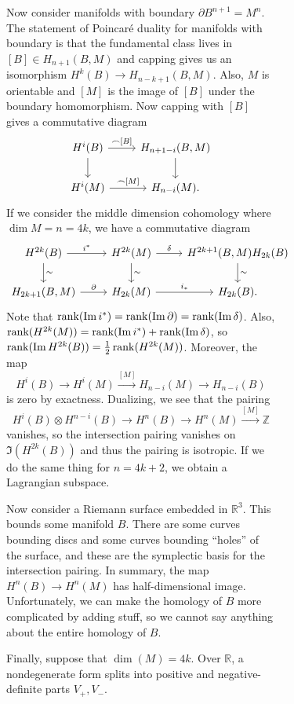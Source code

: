 \documentclass[leqno, openany]{memoir}
\theoremstyle{definition}
\theoremstyle{remark}
\theoremstyle{plain}
\theoremstyle{definition}
\theoremstyle{remark}
\newcommand{\R}{\mathbb{R}}
\newcommand{\Z}{\mathbb{Z}}
\begin{document}
\begin{figure}[H]
\begin{figure}[H]
Now consider manifolds with boundary $\partial B^{n+1} = M^n$. The statement of
Poincar\'e duality for manifolds with boundary is that the fundamental class
lives in $[B] \in H_{n+1}(B, M)$ and capping gives us an isomorphism $H^k(B)
\to H_{n-k+1}(B, M)$. Also, $M$ is orientable and $[M]$ is the image of $[B]$
under the boundary homomorphism. Now capping with $[B]$ gives a commutative
diagram \begin{equation*} \begin{tikzcd} H^i(B) \arrow{r}{\frown {[B]}}
\arrow{d} & H_{n+1-i}(B,M) \arrow{d} \\ H^i(M) \arrow{r}{\frown {[M]}} &
H_{n-i}(M).  \end{tikzcd} \end{equation*} If we consider the middle dimension
cohomology where $\dim M = n = 4k$, we have a commutative diagram
\begin{equation*} \begin{tikzcd} H^{2k}(B) \arrow{r}{i^*} \arrow{d}{\sim} &
    H^{2k}(M) \arrow{d}{\sim} \arrow{r}{\delta} & H^{2k+1}(B,M) \arrow{d}{\sim}
    H_{2k}(B) \\ H_{2k+1}(B,M) \arrow{r}{\partial} & H_{2k}(M) \arrow{r}{i_*} &
    H_{2k}(B).  \end{tikzcd} \end{equation*} Note that $\rank (\Im i^*) = \rank
    (\Im \partial) = \rank (\Im \delta)$. Also, $\rank(H^{2k}(M)) = \rank(\Im
    i^*) + \rank (\Im \delta)$, so $\rank (\Im H^{2k}(B)) = \frac{1}{2} \rank
    (H^{2k}(M))$. Moreover, the map \[ H^i(B) \to H^i(M) \xrightarrow{{[M]}}
        H_{n-i}(M) \to H_{n-i}(B) \] is zero by exactness. Dualizing, we see
        that the pairing \[ H^i(B) \otimes H^{n-i}(B) \to H^n(B) \to H^n(M)
        \xrightarrow{{[M]}} \Z \] vanishes, so the intersection pairing
        vanishes on $\Im (H^{2k}(B))$ and thus the pairing is isotropic. If we
        do the same thing for $n = 4k+2$, we obtain a Lagrangian subspace.

Now consider a Riemann surface embedded in $\R^3$. This bounds some manifold
$B$. There are some curves bounding discs and some curves bounding ``holes'' of
the surface, and these are the symplectic basis for the intersection pairing.
In summary, the map $H^n(B) \to H^n(M)$ has half-dimensional image.
Unfortunately, we can make the homology of $B$ more complicated by adding
stuff, so we cannot say anything about the entire homology of $B$.

Finally, suppose that $\dim (M) = 4k$. Over $\R$, a nondegenerate form splits
into positive and negative-definite parts $V_+, V_-$.


\end{figure}
\end{figure}
\end{document}
